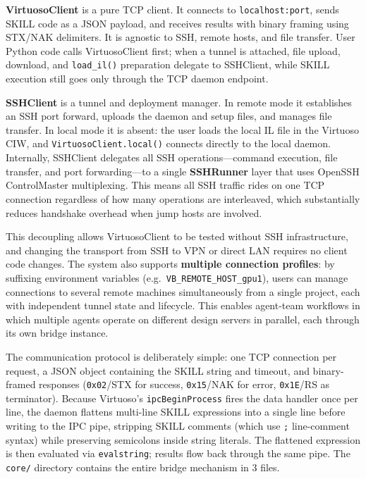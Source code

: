 \documentclass[lettersize,journal]{ieee_template/IEEEtran}
\begin{document}
\textbf{VirtuosoClient} is a pure TCP client. It connects to \texttt{localhost:port}, sends SKILL code as a JSON payload, and receives results with binary framing using STX/NAK delimiters. It is agnostic to SSH, remote hosts, and file transfer. User Python code calls VirtuosoClient first; when a tunnel is attached, file upload, download, and \texttt{load\_il()} preparation delegate to SSHClient, while SKILL execution still goes only through the TCP daemon endpoint.

\textbf{SSHClient} is a tunnel and deployment manager. In remote mode it establishes an SSH port forward, uploads the daemon and setup files, and manages file transfer. In local mode it is absent: the user loads the local IL file in the Virtuoso CIW, and \texttt{VirtuosoClient.local()} connects directly to the local daemon. Internally, SSHClient delegates all SSH operations---command execution, file transfer, and port forwarding---to a single \textbf{SSHRunner} layer that uses OpenSSH ControlMaster multiplexing. This means all SSH traffic rides on one TCP connection regardless of how many operations are interleaved, which substantially reduces handshake overhead when jump hosts are involved.

This decoupling allows VirtuosoClient to be tested without SSH infrastructure, and changing the transport from SSH to VPN or direct LAN requires no client code changes. The system also supports \textbf{multiple connection profiles}: by suffixing environment variables (e.g.\ \texttt{VB\_REMOTE\_HOST\_gpu1}), users can manage connections to several remote machines simultaneously from a single project, each with independent tunnel state and lifecycle. This enables agent-team workflows in which multiple agents operate on different design servers in parallel, each through its own bridge instance.

The communication protocol is deliberately simple: one TCP connection per request, a JSON object containing the SKILL string and timeout, and binary-framed responses (\texttt{0x02}/STX for success, \texttt{0x15}/NAK for error, \texttt{0x1E}/RS as terminator). Because Virtuoso's \texttt{ipcBeginProcess} fires the data handler once per line, the daemon flattens multi-line SKILL expressions into a single line before writing to the IPC pipe, stripping SKILL comments (which use \texttt{;} line-comment syntax) while preserving semicolons inside string literals. The flattened expression is then evaluated via \texttt{evalstring}; results flow back through the same pipe. The \texttt{core/} directory contains the entire bridge mechanism in 3 files.
\end{document}
